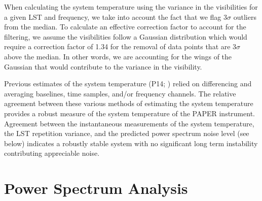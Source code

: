 \documentclass[twocolumn,numberedappendix]{emulateapj} \shorttitle{New Limits on the 21 cm Power Spectrum at $z=8.4$}
\begin{document}
When calculating the system temperature using the variance in the visibilities
for a given LST and frequency, we take into account the fact that we flag
3$\sigma$ outliers from the median. To calculate an effective correction factor
to account for the filtering, we assume the visibilities follow a Gaussian
distribution which would require a correction factor of 1.34 for the removal of
data points that are 3$\sigma$ above the median. In other words, we are
accounting for the wings of the Gaussian that would contribute to the variance
in the visibility.

Previous estimates
of the system temperature
(P14; \citealt{jacobs_et_al2014}) relied on differencing and averaging
baselines, time samples, and/or frequency channels. The relative agreement
between these various methods of estimating the system temperature provides a
robust measure of the system temperature of the PAPER instrument. Agreement
between the instantaneous measurements of the system temperature, the LST
repetition variance, and the predicted power spectrum noise level (see below)
indicates a robustly stable system with no significant long term instability
contributing appreciable noise.



\section{Power Spectrum Analysis}\label{sec:oqe}
\end{document}
